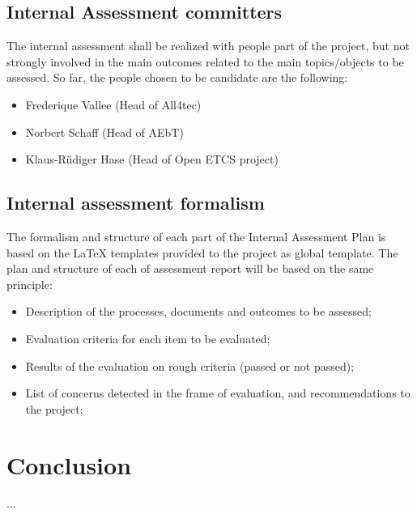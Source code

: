 \documentclass{template/openetcs_article}
\begin{document}
\subsection{Internal Assessment committers}
The internal assessment shall be realized with people part of the project, but not strongly involved in the main outcomes related to the main topics/objects to be assessed.
So far, the people chosen to be candidate are the following:
\begin{itemize}
\item Frederique Vallee (Head of All4tec)
\item Norbert Schaff (Head of AEbT)
\item Klaus-Rüdiger Hase (Head of Open ETCS project)
\end{itemize}

\subsection{Internal assessment formalism}
The formalism and structure of each part of the Internal Assessment Plan is based on the LaTeX templates provided to the project as global template.
The plan and structure of each of assessment report will be based on the same principle:
 \begin{itemize}
\item Description of the processes, documents and outcomes to be assessed;
\item Evaluation criteria for each item to be evaluated;
\item Results of the evaluation on rough criteria (passed or not passed);
\item List of concerns detected in the frame of evaluation, and recommendations to the project;
\end{itemize}

\section{Conclusion}
...



\end{document}
